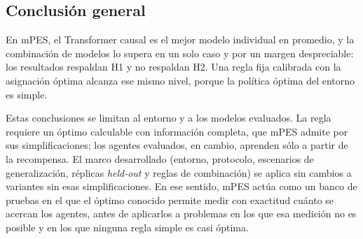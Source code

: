 \documentclass[../00_Main/Main.tex]{subfiles}
\begin{document}
\subsection{Conclusi\'on general}

En mPES, el Transformer causal es el mejor modelo individual en promedio, y la
combinaci\'on de modelos lo supera en un solo caso y por un margen
despreciable: los resultados respaldan H1 y no respaldan H2. Una regla fija
calibrada con la asignaci\'on \'optima alcanza ese mismo nivel, porque la
pol\'itica \'optima del entorno es simple.

Estas conclusiones se limitan al
entorno y a los modelos evaluados. La regla requiere un \'optimo calculable
con informaci\'on completa, que mPES admite por sus simplificaciones; los
agentes evaluados, en cambio, aprenden s\'olo a partir de la recompensa. El
marco desarrollado (entorno, protocolo, escenarios de generalizaci\'on,
r\'eplicas \emph{held-out} y reglas de combinaci\'on) se aplica sin cambios a
variantes sin esas simplificaciones. En ese sentido, mPES act\'ua como un
banco de pruebas en el que el \'optimo conocido permite medir con exactitud
cu\'anto se acercan los agentes, antes de aplicarlos a problemas en los que
esa medici\'on no es posible y en los que ninguna regla simple es casi
\'optima.

\biblio %
\end{document}
